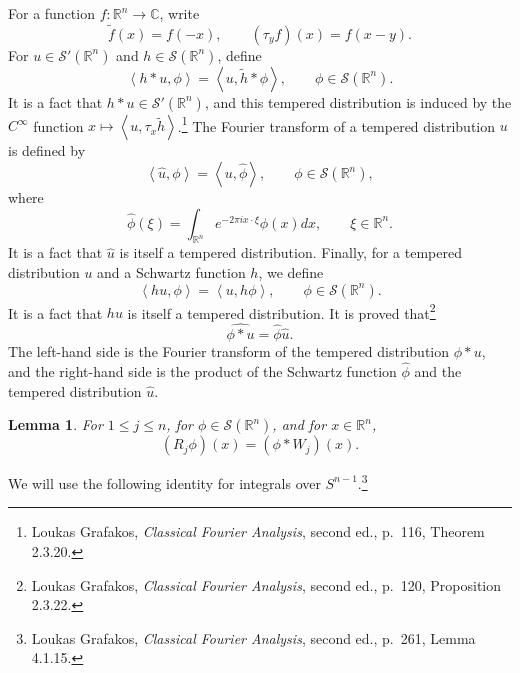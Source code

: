 \documentclass{article}
\newcommand{\inner}[2]{\left\langle #1, #2 \right\rangle}
\newtheorem{lemma}[theorem]{Lemma}
\theoremstyle{definition}
\begin{document}
For a function $f:\mathbb{R}^n \to \mathbb{C}$, write
\[
\widetilde{f}(x) = f(-x), \qquad (\tau_yf)(x)=f(x-y).
\]
For $u \in \mathscr{S}'(\mathbb{R}^n)$ and $h \in \mathscr{S}(\mathbb{R}^n)$, define
\[
\inner{h*u}{\phi} = \inner{u}{\widetilde{h}*\phi},\qquad \phi \in \mathscr{S}(\mathbb{R}^n).
\]
It is a fact that $h*u \in \mathscr{S}'(\mathbb{R}^n)$, and this tempered distribution is induced by the $C^\infty$ function
$x \mapsto \inner{u}{\tau_x \widetilde{h}}$.\footnote{Loukas Grafakos, {\em Classical Fourier Analysis}, second ed.,
p.~116, Theorem 2.3.20.}
The Fourier transform of a tempered distribution $u$ is defined by
\[
\inner{\widehat{u}}{\phi} = \inner{u}{\widehat{\phi}},\qquad \phi \in \mathscr{S}(\mathbb{R}^n),
\]
where
\[
\widehat{\phi}(\xi) = \int_{\mathbb{R}^n} e^{-2\pi ix\cdot \xi} \phi(x) dx,\qquad \xi \in \mathbb{R}^n.
\]
It is a fact that $\widehat{u}$ is itself a tempered distribution.
Finally, for a tempered distribution $u$ and a Schwartz function $h$, we define
\[
\inner{hu}{\phi} = \inner{u}{h\phi},\qquad \phi \in \mathscr{S}(\mathbb{R}^n).
\]
It is a fact that $hu$ is itself a tempered distribution.
It is proved that\footnote{Loukas Grafakos, {\em Classical Fourier Analysis}, second ed.,
p.~120, Proposition 2.3.22.}
\[
\widehat{\phi*u} = \widehat{\phi} \widehat{u}.
\]
The left-hand side is the Fourier transform of the tempered distribution $\phi*u$, and the right-hand side is the product
of the Schwartz function $\widehat{\phi}$ and the tempered distribution $\widehat{u}$. 

\begin{lemma}
For $1 \leq j \leq n$, for $\phi \in \mathscr{S}(\mathbb{R}^n)$, and for $x \in \mathbb{R}^n$,
\[
(R_j \phi)(x) = (\phi*W_j)(x).
\]
\end{lemma}

We will use the following identity for integrals over $S^{n-1}$.\footnote{Loukas Grafakos, {\em Classical Fourier Analysis}, second ed.,
p.~261, Lemma 4.1.15.}
\end{document}
